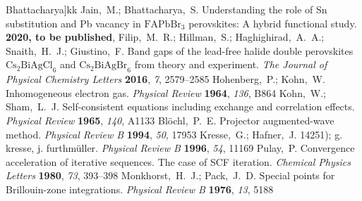 \documentclass[journal=jpclcd,manuscript=letter]{achemso}
\begin{document}
\begin{mcitethebibliography}{49}
  Bhattacharya]{kk}
Jain,~M.; Bhattacharya,~S. Understanding the role of Sn substitution and Pb
  vacancy in ${\mathrm{FAPbBr}}_{3}$ perovskites: A hybrid functional study.
  \textbf{2020, to be published}, \relax
\mciteBstWouldAddEndPunctfalse
\mciteSetBstMidEndSepPunct{\mcitedefaultmidpunct}
{}{\mcitedefaultseppunct}\relax
\EndOfBibitem
{}
Filip,~M.~R.; Hillman,~S.; Haghighirad,~A.~A.; Snaith,~H.~J.; Giustino,~F. Band
  gaps of the lead-free halide double perovskites
  ${\mathrm{Cs}}_{2}{\mathrm{BiAgCl}}_{6}$ and
  ${\mathrm{Cs}}_{2}{\mathrm{BiAgBr}}_{6}$ from theory and experiment.
  \emph{The Journal of Physical Chemistry Letters} \textbf{2016}, \emph{7},
  2579--2585\relax
\mciteBstWouldAddEndPuncttrue
\mciteSetBstMidEndSepPunct{\mcitedefaultmidpunct}
{\mcitedefaultendpunct}{\mcitedefaultseppunct}\relax
\EndOfBibitem
{}
Hohenberg,~P.; Kohn,~W. Inhomogeneous electron gas. \emph{Physical Review}
  \textbf{1964}, \emph{136}, B864\relax
\mciteBstWouldAddEndPuncttrue
\mciteSetBstMidEndSepPunct{\mcitedefaultmidpunct}
{\mcitedefaultendpunct}{\mcitedefaultseppunct}\relax
\EndOfBibitem
{}
Kohn,~W.; Sham,~L.~J. Self-consistent equations including exchange and
  correlation effects. \emph{Physical Review} \textbf{1965}, \emph{140},
  A1133\relax
\mciteBstWouldAddEndPuncttrue
\mciteSetBstMidEndSepPunct{\mcitedefaultmidpunct}
{\mcitedefaultendpunct}{\mcitedefaultseppunct}\relax
\EndOfBibitem
{}
Bl{\"o}chl,~P.~E. Projector augmented-wave method. \emph{Physical Review B}
  \textbf{1994}, \emph{50}, 17953\relax
\mciteBstWouldAddEndPuncttrue
\mciteSetBstMidEndSepPunct{\mcitedefaultmidpunct}
{\mcitedefaultendpunct}{\mcitedefaultseppunct}\relax
\EndOfBibitem
{}
Kresse,~G.; Hafner,~J. 14251); g. kresse, j. furthm{\"u}ller. \emph{Physical
  Review B} \textbf{1996}, \emph{54}, 11169\relax
\mciteBstWouldAddEndPuncttrue
\mciteSetBstMidEndSepPunct{\mcitedefaultmidpunct}
{\mcitedefaultendpunct}{\mcitedefaultseppunct}\relax
\EndOfBibitem
{}
Pulay,~P. Convergence acceleration of iterative sequences. The case of SCF
  iteration. \emph{Chemical Physics Letters} \textbf{1980}, \emph{73},
  393--398\relax
\mciteBstWouldAddEndPuncttrue
\mciteSetBstMidEndSepPunct{\mcitedefaultmidpunct}
{\mcitedefaultendpunct}{\mcitedefaultseppunct}\relax
\EndOfBibitem
{}
Monkhorst,~H.~J.; Pack,~J.~D. Special points for Brillouin-zone integrations.
  \emph{Physical Review B} \textbf{1976}, \emph{13}, 5188\relax
\mciteBstWouldAddEndPuncttrue
\mciteSetBstMidEndSepPunct{\mcitedefaultmidpunct}
{\mcitedefaultendpunct}{\mcitedefaultseppunct}\relax
\EndOfBibitem
\end{mcitethebibliography}
\end{document}
